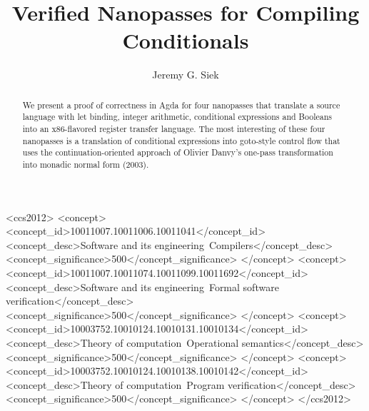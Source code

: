 \documentclass[sigplan,screen]{acmart}
\begin{document}
\title{Verified Nanopasses for Compiling Conditionals}

\author{Jeremy G. Siek}


\begin{abstract}
We present a proof of correctness in Agda for four nanopasses that
translate a source language with let binding, integer arithmetic,
conditional expressions and Booleans into an x86-flavored register
transfer language. The most interesting of these four nanopasses is a
translation of conditional expressions into goto-style control flow
that uses the continuation-oriented approach of Olivier Danvy's
one-pass transformation into monadic normal form (2003).
\end{abstract}

\begin{CCSXML}
<ccs2012>
   <concept>
       <concept_id>10011007.10011006.10011041</concept_id>
       <concept_desc>Software and its engineering~Compilers</concept_desc>
       <concept_significance>500</concept_significance>
       </concept>
   <concept>
       <concept_id>10011007.10011074.10011099.10011692</concept_id>
       <concept_desc>Software and its engineering~Formal software verification</concept_desc>
       <concept_significance>500</concept_significance>
       </concept>
   <concept>
       <concept_id>10003752.10010124.10010131.10010134</concept_id>
       <concept_desc>Theory of computation~Operational semantics</concept_desc>
       <concept_significance>500</concept_significance>
       </concept>
   <concept>
       <concept_id>10003752.10010124.10010138.10010142</concept_id>
       <concept_desc>Theory of computation~Program verification</concept_desc>
       <concept_significance>500</concept_significance>
       </concept>
 </ccs2012>
\end{CCSXML}
\end{document}
